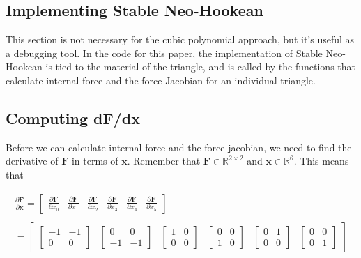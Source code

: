 \documentclass[twocolumn,10pt]{asme2ej}
\begin{document}
\subsection{Implementing Stable Neo-Hookean}

This section is not necessary for the cubic polynomial approach, but it's useful as a debugging tool. In the code
for this paper, the implementation of Stable Neo-Hookean is tied to the material of the triangle, and is called by the functions
that calculate internal force and the force Jacobian for an individual triangle.

\subsection{Computing dF/dx}

Before we can calculate internal force and the force jacobian, we need to find the derivative of $\bm{F}$ in terms of $\bm{x}$. Remember that $\bm{F} \in \mathbb{R}^{2 \times 2}$ and $\bm{x} \in \mathbb{R}^6$. This means that

\begin{equation}
  \begin{split}
    \frac{\partial \bm{F}}{\partial \bm{x}} = \begin{bmatrix} \frac{\partial \bm{F}}{\partial x_0} & \frac{\partial \bm{F}}{\partial x_1}
    & \frac{\partial \bm{F}}{\partial x_2} & \frac{\partial \bm{F}}{\partial x_3} & \frac{\partial \bm{F}}{\partial x_4}
    & \frac{\partial \bm{F}}{\partial x_5} \end{bmatrix} \\ \\
    = \begin{bmatrix} \begin{bmatrix} -1 & -1 \\ 0 & 0 \end{bmatrix} & \begin{bmatrix} 0 & 0 \\ -1 & -1 \end{bmatrix}
  & \begin{bmatrix} 1 & 0 \\ 0 & 0 \end{bmatrix} & \begin{bmatrix} 0 & 0 \\ 1 & 0 \end{bmatrix}
  & \begin{bmatrix} 0 & 1 \\ 0 & 0 \end{bmatrix} & \begin{bmatrix} 0 & 0 \\ 0 & 1 \end{bmatrix}\end{bmatrix}
  \end{split}
\label{eq_dFdx}
\end{equation}
\end{document}
